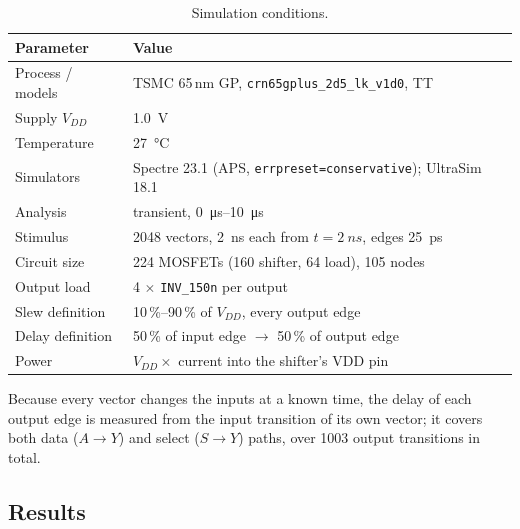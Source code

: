 \documentclass[11pt]{article}
\begin{document}
\begin{table}[H]
\centering
\caption{Simulation conditions.}
\label{tab:setup}
\begin{tabular}{ll}
\toprule
Parameter & Value \\
\midrule
Process / models      & TSMC 65\,nm GP, \texttt{crn65gplus\_2d5\_lk\_v1d0}, TT \\
Supply $V_{DD}$       & \SI{1.0}{V} \\
Temperature           & \SI{27}{\celsius} \\
Simulators            & Spectre 23.1 (APS, \texttt{errpreset=conservative}); UltraSim 18.1 \\
Analysis              & transient, \SIrange{0}{10}{\micro s} \\
Stimulus              & 2048 vectors, \SI{2}{ns} each from $t=\SI{2}{ns}$, edges \SI{25}{ps} \\
Circuit size          & 224 MOSFETs (160 shifter, 64 load), 105 nodes \\
Output load           & 4 $\times$ \texttt{INV\_150n} per output \\
Slew definition       & 10\,\%--90\,\% of $V_{DD}$, every output edge \\
Delay definition      & 50\,\% of input edge $\rightarrow$ 50\,\% of output edge \\
Power                 & $V_{DD} \times$ current into the shifter's VDD pin \\
\bottomrule
\end{tabular}
\end{table}

Because every vector changes the inputs at a known time, the delay of each
output edge is measured from the input transition of its own vector; it
covers both data ($A \rightarrow Y$) and select ($S \rightarrow Y$) paths,
over 1003 output transitions in total.

\subsection{Results}
\end{document}
